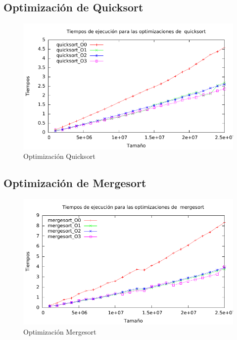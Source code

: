 \documentclass[a4paper, 11pt]{article}
\begin{document}
\subsection{Optimización de Quicksort}

\begin{figure}[H]\includegraphics[width=13cm]{img/quicksort_optim_g.pdf} \centering
	\caption{Optimización Quicksort}\end{figure}

\subsection{Optimización de Mergesort}

\begin{figure}[H]\includegraphics[width=13cm]{img/mergesort_optim_g.pdf} \centering
	\caption{Optimización Mergesort}\end{figure}
\end{document}
